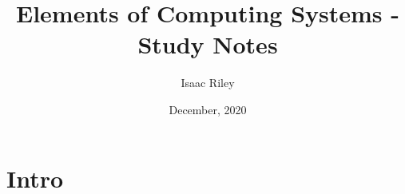 \documentclass[10pt]{article}
\title{Elements of Computing Systems - Study Notes}
\author{Isaac Riley}
\date{December, 2020}
\begin{document}
\maketitle

\section{Intro}
\end{document}
